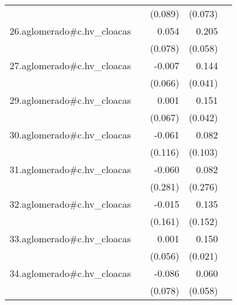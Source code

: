 {\begin{longtable}{l*{4}{D{.}{.}{-1}}}
            &                     &     (0.089)         &     (0.073)         &                     \\
\addlinespace
26.aglomerado#c.hv\_cloacas&                     &       0.054         &       0.205\sym{***}&                     \\
            &                     &     (0.078)         &     (0.058)         &                     \\
\addlinespace
27.aglomerado#c.hv\_cloacas&                     &      -0.007         &       0.144\sym{***}&                     \\
            &                     &     (0.066)         &     (0.041)         &                     \\
\addlinespace
29.aglomerado#c.hv\_cloacas&                     &       0.001         &       0.151\sym{***}&                     \\
            &                     &     (0.067)         &     (0.042)         &                     \\
\addlinespace
30.aglomerado#c.hv\_cloacas&                     &      -0.061         &       0.082         &                     \\
            &                     &     (0.116)         &     (0.103)         &                     \\
\addlinespace
31.aglomerado#c.hv\_cloacas&                     &      -0.060         &       0.082         &                     \\
            &                     &     (0.281)         &     (0.276)         &                     \\
\addlinespace
32.aglomerado#c.hv\_cloacas&                     &      -0.015         &       0.135         &                     \\
            &                     &     (0.161)         &     (0.152)         &                     \\
\addlinespace
33.aglomerado#c.hv\_cloacas&                     &       0.001         &       0.150\sym{***}&                     \\
            &                     &     (0.056)         &     (0.021)         &                     \\
\addlinespace
34.aglomerado#c.hv\_cloacas&                     &      -0.086         &       0.060         &                     \\
            &                     &     (0.078)         &     (0.058)         &                     \\

\end{longtable}}

